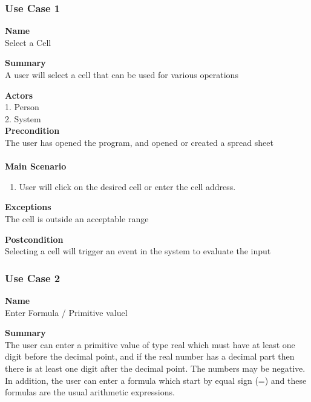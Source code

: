 \documentclass[12pt]{article}
\begin{document}
\clearpage

\subsubsection{Use Case 1} \label{uc:1}

\noindent
{\bf Name}\\
Select a Cell

\noindent
{\bf Summary}\\
A user will select a cell that can be used for various operations

\noindent
{\bf Actors}\\
1. Person\\
2. System\\

\noindent
{\bf Precondition}\\
The user has opened the program, and opened or created a spread sheet\\
\noindent\\
{\bf Main Scenario}\\
\vspace*{-0.2in}
\begin{enumerate}
\item User will click on the desired cell or enter the cell address.
\end{enumerate}

\noindent
{\bf Exceptions}\\
The cell is outside an acceptable range

\noindent
{\bf Postcondition}\\
Selecting a cell will trigger an event in the system to evaluate the input

\clearpage

\subsubsection{Use Case 2} \label{uc:2}

\noindent
{\bf Name}\\
Enter Formula / Primitive valuel

\noindent
{\bf Summary}\\
The user can enter a primitive value of type real which must have at least
one digit before the decimal point, and if the real number has a decimal part then there is
at least one digit after the decimal point. The numbers may be negative. In addition, the
user can enter a formula which start by equal sign (=) and these formulas are the usual
arithmetic expressions.
\end{document}
